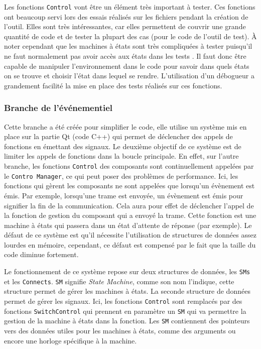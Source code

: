 \documentclass[a4paper]{article}
\begin{document}
Les fonctions \verb|Control| vont être un élément très important à tester. Ces
fonctions ont beaucoup servi lors des essais réalisés sur les fichiers pendant la
création de l'outil. Elles sont très intéressantes, car elles permettent de
couvrir une grande quantité de code et de tester la plupart des cas (pour le
code de l'outil de test). À noter cependant que les machines à états sont très
compliquées à tester puisqu'il ne faut normalement pas avoir accès aux états
dans les tests \cite{teststatemachines}. Il faut donc être capable de manipuler
l'environnement dans le code pour savoir dans quels états on se trouve et choisir
l'état dans lequel se rendre. L'utilisation d'un débogueur a grandement facilité
la mise en place des tests réalisés sur ces fonctions.

\subsubsection{Branche de l'événementiel}
\label{brancheevent}

Cette branche a été créée pour simplifier le code, elle utilise un système mis
en place sur la partie Qt (code C++) qui  permet de déclencher des appels de
fonctions en émettant des signaux. Le deuxième objectif de ce système est de
limiter les appels de fonctions dans la boucle principale. En effet, sur l'autre
branche, les fonctions \verb|Control| des composants sont continuellement
appelées par le \verb|Contro Manager|, ce qui peut poser des problèmes de
performance. Ici, les fonctions qui gèrent les composants ne sont appelées que
lorsqu'un évènement est émis. Par exemple, lorsqu'une trame est envoyée, un
évènement est émis pour signifier la fin de la communication. Cela aura pour
effet de déclencher l'appel de la fonction de gestion du composant qui a envoyé
la trame. Cette fonction est une machine à états qui passera dans un état
d'attente de réponse (par exemple). Le défaut de ce système est qu'il nécessite
l'utilisation de structures de données assez lourdes en mémoire, cependant, ce
défaut est compensé par le fait que la taille du code diminue fortement.

Le fonctionnement de ce système repose sur deux structures de données, les
\verb|SMs| et les \verb|Connects|. \verb|SM| signifie \textit{State Machine},
comme son nom l'indique, cette structure permet de gérer les machines à états.
La seconde structure de données permet de gérer les signaux. Ici, les fonctions
\verb|Control| sont remplacés par des fonctions \verb|SwitchControl| qui prennent
en paramètre un \verb|SM| qui va permettre la gestion de la machine à états dans
la fonction. Les \verb|SM| contiennent des pointeurs vers des données utiles
pour les machines à états, comme des arguments ou encore une horloge spécifique
à la machine.
\end{document}
